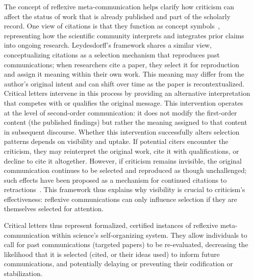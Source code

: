 \documentclass[12pt]{article} %
\begin{document}
The concept of reflexive meta-communication helps clarify how criticism can affect the status of work that is already published and part of the scholarly record. 
One view of citations is that they function as concept symbols~\cite{small1978cited}, representing how the scientific community interprets and integrates prior claims into ongoing research.
Leydesdorff's framework shares a similar view, conceptualizing citations as a selection mechanism that reproduces past communications; when researchers cite a paper, they select it for reproduction and assign it meaning within their own work.
This meaning may differ from the author's original intent and can shift over time as the paper is recontextualized.
Critical letters intervene in this process by providing an alternative interpretation that competes with or qualifies the original message. This intervention operates at the level of second-order communication: it does not modify the first-order content (the published findings) but rather the meaning assigned to that content in subsequent discourse. 
Whether this intervention successfully alters selection patterns depends on visibility and uptake.
If potential citers encounter the criticism, they may reinterpret the original work, cite it with qualifications, or decline to cite it altogether. 
However, if criticism remains invisible, the original communication continues to be selected and reproduced as though unchallenged; such effects have been proposed as a mechanism for continued citations to retractions~\cite{woo_2024_retractions}.  
This framework thus explains why visibility is crucial to criticism's effectiveness: reflexive communications can only influence selection if they are themselves selected for attention.

Critical letters thus represent formalized, certified instances of reflexive meta-communication within science's self-organizing system.
They allow individuals to call for past communications (targeted papers) to be re-evaluated, decreasing the likelihood that it is selected (cited, or their ideas used) to inform future communications, and potentially delaying or preventing their codification or stabilization. 
\end{document}
